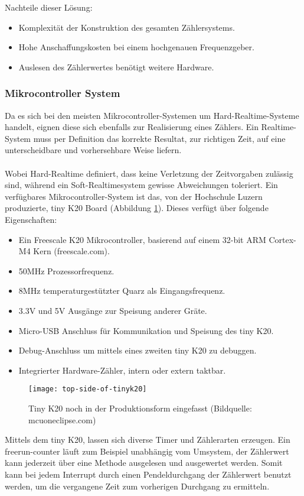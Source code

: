     Nachteile dieser Lösung:
    \begin{itemize}
    	\item Komplexität der Konstruktion des gesamten Zählersystems.
    	\item Hohe Anschaffungskosten bei einem hochgenauen Frequenzgeber.
    	\item Auslesen des Zählerwertes benötigt weitere Hardware.
    \end{itemize}
	\subsubsection{Mikrocontroller System}
   		Da es sich bei den meisten Mikrocontroller-Systemen um Hard-Realtime-Systeme handelt, eignen diese sich ebenfalls zur Realisierung eines Zählers. Ein Realtime-System muss per Definition das korrekte Resultat, zur richtigen Zeit, auf eine unterscheidbare und vorhersehbare Weise liefern.\\
           \\
		Wobei Hard-Realtime definiert, dass keine Verletzung der Zeitvorgaben zulässig sind, während ein Soft-Realtimesystem gewisse Abweichungen toleriert. Ein verfügbares Mikrocontroller-System ist das, von der Hochschule Luzern produzierte, tiny K20 Board (Abbildung \ref{fig:TinyK20}). Dieses verfügt über folgende Eigenschaften:
		\begin{itemize}
			\item Ein Freescale K20 Mikrocontroller, basierend auf einem  32-bit ARM Cortex-M4 Kern (freescale.com).
			\item 50MHz Prozessorfrequenz.
			\item 8MHz temperaturgestützter Quarz als Eingangsfrequenz.
			\item 3.3V und 5V Ausgänge zur Speisung anderer Gräte.
			\item Micro-USB Anschluss für Kommunikation und Speisung des tiny K20.
			\item Debug-Anschluss um mittels eines zweiten tiny K20 zu debuggen.
			\item Integrierter Hardware-Zähler, intern oder extern taktbar.
		\end{itemize}
		\begin{figure}[H]
        	\centering
        	\texttt{[image: top-side-of-tinyk20]}
        	\caption{Tiny K20 noch in der Produktionsform eingefasst (Bildquelle: mcuoneclipse.com)}
        	\label{fig:TinyK20}
    	\end{figure}
    	Mittels dem tiny K20, lassen sich diverse Timer und Zählerarten erzeugen. Ein \glqq{}freerun-counter\grqq{} läuft zum Beispiel unabhängig vom Umsystem, der Zählerwert kann jederzeit über eine Methode ausgelesen und ausgewertet werden. Somit kann bei jedem Interrupt durch einen Pendeldurchgang der Zählerwert benutzt werden, um die vergangene Zeit zum vorherigen Durchgang zu ermitteln. 
